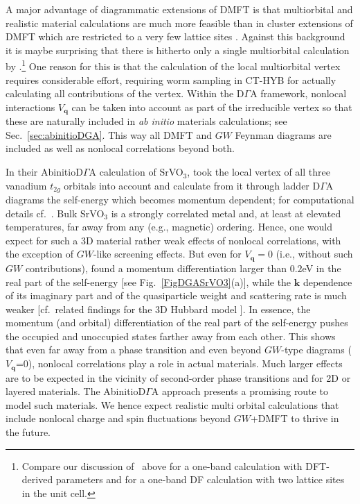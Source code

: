 \documentclass[rmp,aps,reprint,amsmath,amssymb,superscriptaddress,showpacs,nofootinbib]{revtex4-1}
\begin{document}
A major advantage of diagrammatic extensions of DMFT is that multiorbital and realistic material calculations are  much more feasible than in cluster extensions of DMFT which are restricted to a very few lattice sites \cite{Biermann2005,Lee2012}. Against this background it is maybe surprising that there is hitherto only a single multiorbital calculation by .\footnote{Compare our discussion of~ above for a one-band calculation with DFT-derived parameters and  for a one-band DF calculation with two lattice sites in the unit cell.} One reason for this is that the calculation of the local multiorbital vertex requires considerable effort, requiring worm sampling in CT-HYB \cite{Gunacker15} for actually  calculating all contributions of the vertex.  Within the D$\Gamma$A framework, nonlocal interactions $V_{\mathbf q}$ can be taken into account as part of the irreducible vertex  so that these are naturally included in  {\em ab initio} materials calculations; see Sec.~\ref{sec:abinitioDGA}. This way all DMFT and $GW$ Feynman diagrams are included as well as nonlocal correlations beyond both.

In their AbinitioD$\Gamma$A calculation of  SrVO$_3$,    took the local vertex of all three vanadium $t_{2g}$ orbitals  into account and calculate from it through ladder D$\Gamma$A diagrams the self-energy which becomes momentum dependent; for computational details cf.~. Bulk SrVO$_3$ is a strongly correlated metal and, at least at elevated temperatures, far away from any (e.g., magnetic) ordering. Hence, one would expect for such a 3D  material rather weak effects of nonlocal correlations, with the exception of $GW$-like screening effects. But even for $V_{\mathbf q}=0$ (i.e., without such $GW$ contributions),  found a momentum differentiation larger than $0.2$eV in the real part  of the self-energy [see Fig.~\ref{FigDGASrVO3}(a)], while the ${\mathbf k}$ dependence of its imaginary part and of the quasiparticle weight and scattering rate is much weaker [cf.\ related findings for the 3D Hubbard model \cite{Schaefer2015}]. In essence, the  momentum (and orbital) differentiation of the real part of the self-energy  pushes the occupied and unoccupied states farther away from each other. This shows that even far away from a phase transition and even beyond $GW$-type diagrams ($V_{\mathbf q}$=0), nonlocal correlations play a role in actual materials. Much larger effects are to be expected  in the vicinity of second-order phase transitions and for 2D or layered materials. The  AbinitioD$\Gamma$A approach presents a promising route to model such materials. We hence expect realistic multi orbital calculations that include nonlocal charge and spin fluctuations beyond $GW$+DMFT to thrive in the future.
\end{document}
